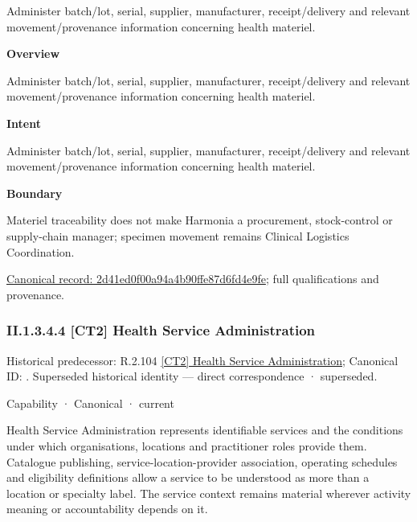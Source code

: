 Administer batch/lot, serial, supplier, manufacturer, receipt/delivery and relevant movement/provenance information concerning health materiel.



\textbf{Overview}



Administer batch/lot, serial, supplier, manufacturer, receipt/delivery and relevant movement/provenance information concerning health materiel.



\textbf{Intent}



Administer batch/lot, serial, supplier, manufacturer, receipt/delivery and relevant movement/provenance information concerning health materiel.



\textbf{Boundary}



Materiel traceability does not make Harmonia a procurement, stock-control or supply-chain manager; specimen movement remains Clinical Logistics Coordination.


{\footnotesize \href{../../../../../../../continuum/strategy/capability/2d41ed0f00a94a4b90ffe87d6fd4e9fe.md}{Canonical record: 2d41ed0f00a94a4b90ffe87d6fd4e9fe}; full qualifications and provenance.}\par
\subsubsection*{II.1.3.4.4 [CT2] Health Service Administration}
\label{navigation:II.1.3.4.4}

{\small Historical predecessor: R.2.104 \hyperref[element:f1ab1258cf2944efb50105e7885f8027]{[CT2] Health Service Administration}; Canonical ID: \texttt{}. Superseded historical identity — direct correspondence · superseded.}\par
\label{element:ba68a52913a0499d8377553bddfa74a4}
{\small Capability · Canonical · current}\par

Health Service Administration represents identifiable services and the conditions under which organisations, locations and practitioner roles provide them. Catalogue publishing, service-location-provider association, operating schedules and eligibility definitions allow a service to be understood as more than a location or specialty label. The service context remains material wherever activity meaning or accountability depends on it.



